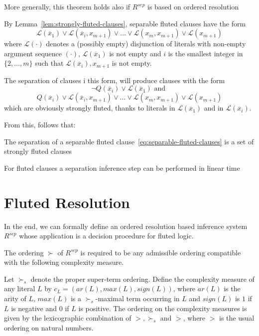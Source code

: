 More generally, this theorem holds also if \(R^{sep}\) is based on ordered resolution

By Lemma~\ref{lem:strongly-fluted-clauses}, separable fluted clauses have the form
\begin{equation}\label{eq:separable-fluted-clauses}
  \mathcal{L}(\overline{x}_1)\lor \mathcal{L}(\overline{x}_i,x_{m+1}) \lor \ldots \lor \mathcal{L}(x_m, x_{m+1}) \lor \mathcal{L}(x_{m+1})
\end{equation}
where \(\mathcal{L}(\cdot)\) denotes a (possibly empty) disjunction of literals with non-empty argument sequence \((\cdot)\), \(\mathcal{L}(\overline{x}_1)\) is not empty and \(i\) is the smallest integer in \(\{2,\ldots, m\}\) such that \(\mathcal{L}(\overline{x}_i), x_{m+1}\) is not empty.

The separation of clauses i this form, will produce clauses with the form
\[
  \neg Q(\overline{x}_i) \lor \mathcal{L}(\overline{x}_1) \text{ and }
\]
\[
  Q(\overline{x}_i) \lor \mathcal{L}(\overline{x}_i,x_{m+1}) \lor \ldots \lor \mathcal{L}(x_m, x_{m+1}) \lor \mathcal{L}(x_{m+1})
\]
which are obviously strongly fluted, thanks to literals in \(\mathcal{L}(\overline{x}_1)\) and in \(\mathcal{L}(\overline{x}_i)\).

From this, follows that:
\begin{lemma}\label{lem:separation-fluted}
  The separation of a separable fluted clause~\ref{eq:separable-fluted-clauses} is a set of strongly fluted clauses
\end{lemma}
\begin{lemma}
  For fluted clauses a separation inference step can be performed in linear time
\end{lemma}


\section{Fluted Resolution}\label{sec:fluted-resolution}

In the end, we can formally define an ordered resolution based inference system \(R^{sep}\) whose application is a decision procedure for fluted logic.

The ordering \(\succ\) of \(R^{sep}\) is required to be any admissible ordering compatible with the following complexity measure.

\begin{definition}
  Let \(\succ_s\) denote the proper super-term ordering. Define the complexity measure of any literal \(L\) by \(c_L = (ar(L),max(L),sign(L))\), where \(ar(L)\) is the arity of \(L\), \(max(L)\) is a \(\succ_s\)-maximal term occurring in \(L\) and \(sign(L)\) is \(1\) if \(L\) is negative and \(0\) if \(L\) is positive. %
  The ordering on the complexity measures is given by the lexicographic combination of \(>,\succ_s \text{ and } >\), where \(>\) is the usual ordering on natural numbers.
\end{definition}

